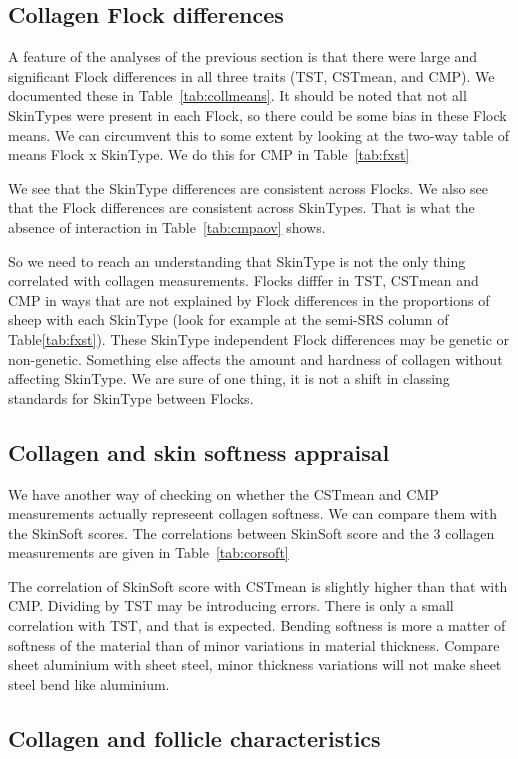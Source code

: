 \documentclass[titlepage]{article}  %
\begin{document}
\subsection{Collagen Flock differences}
\label{sec:collflock}
A feature of the analyses of the previous section is that there were  large and significant Flock differences in all three traits (TST, CSTmean, and CMP). We documented  these in Table~\ref{tab:collmeans}. It should be noted that not all SkinTypes were present in each Flock, so there could be some bias in these Flock means.  We can circumvent this to some extent by looking at the two-way table of means Flock x SkinType. We do this for CMP in Table~\ref{tab:fxst}

We see that the SkinType differences are consistent across Flocks. We also see that the Flock differences are consistent across SkinTypes. That is what the absence of interaction in Table~\ref{tab:cmpaov} shows. 

So we need to reach an understanding that SkinType is not the only thing correlated with collagen measurements. Flocks difffer in TST, CSTmean and CMP in ways that are not explained by Flock differences in the proportions of sheep with each SkinType (look for example at the semi-SRS column of Table\ref{tab:fxst}). These SkinType independent Flock differences may be genetic or non-genetic. Something else affects the amount and hardness of collagen without affecting SkinType. We are sure of one thing, it is not a shift in classing standards for SkinType between Flocks.

\subsection{Collagen and skin softness appraisal}
We have another way of checking on whether the CSTmean and CMP measurements actually represeent collagen softness. We can compare them with the SkinSoft scores.
The correlations between SkinSoft score and the 3 collagen measurements are given in Table~\ref{tab:corsoft}

The correlation of SkinSoft score with CSTmean is slightly higher than that with CMP. Dividing by TST may be introducing errors. There is only a small correlation with TST, and that is expected. Bending softness is more a matter of softness of the material than of minor variations in material thickness. Compare sheet aluminium with sheet steel, minor thickness variations will not make sheet steel bend like aluminium.

\subsection{Collagen and follicle characteristics}
\end{document}
